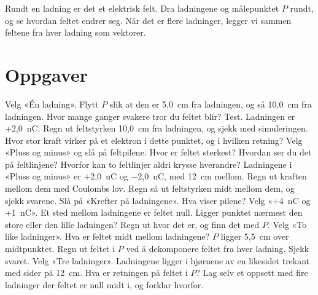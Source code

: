 \documentclass[11pt]{article}
\begin{document}

Rundt en ladning er det et elektrisk felt. Dra ladningene og målepunktet $P$ rundt, og se hvordan feltet endrer seg. Når det er flere ladninger, legger vi sammen feltene fra hver ladning som vektorer.

\section*{Oppgaver}

\begin{oppgaveliste}
\oppgave {}Velg «Én ladning». Flytt $P$ slik at den er 5,0~cm fra ladningen, og så 10,0~cm fra ladningen. Hvor mange ganger svakere tror du feltet blir? Test.
\svar
\oppgave {}Ladningen er +2,0~nC. Regn ut feltstyrken 10,0~cm fra ladningen, og sjekk med simuleringen. Hvor stor kraft virker på et elektron i dette punktet, og i hvilken retning?
\svar
\oppgave {}Velg «Pluss og minus» og slå på feltpilene. Hvor er feltet sterkest? Hvordan ser du det på feltlinjene? Hvorfor kan to feltlinjer aldri krysse hverandre?
\svar
\oppgave {}Ladningene i «Pluss og minus» er +2,0~nC og −2,0~nC, med 12~cm mellom. Regn ut kraften mellom dem med Coulombs lov. Regn så ut feltstyrken midt mellom dem, og sjekk svarene. Slå på «Krefter på ladningene». Hva viser pilene?
\svar
\oppgave {}Velg «+4~nC og +1~nC». Et sted mellom ladningene er feltet null. Ligger punktet nærmest den store eller den lille ladningen? Regn ut hvor det er, og finn det med $P$.
\svar
\oppgave {}Velg «To like ladninger». Hva er feltet midt mellom ladningene? $P$ ligger 5,5~cm over midtpunktet. Regn ut feltet i $P$ ved å dekomponere feltet fra hver ladning. Sjekk svaret.
\svar
\oppgave {}Velg «Tre ladninger». Ladningene ligger i hjørnene av en likesidet trekant med sider på 12~cm. Hva er retningen på feltet i $P$? Lag selv et oppsett med fire ladninger der feltet er null midt i, og forklar hvorfor.
\svar
\end{oppgaveliste}
\end{document}
